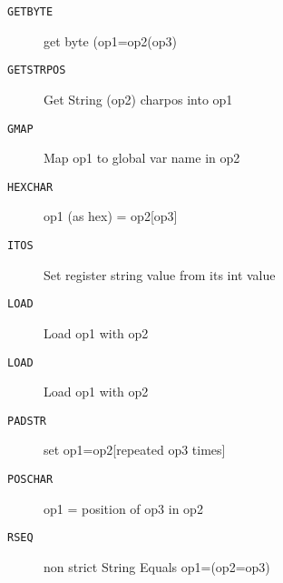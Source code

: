 
\begin{description}
\item[\texttt{GETBYTE    }]  get byte  (op1=op2(op3)\\
\end{description}

\begin{description}
\item[\texttt{GETSTRPOS  }]  Get String (op2) charpos into op1\\
\end{description}

\begin{description}
\item[\texttt{GMAP       }]  Map op1 to global var name in op2\\
\end{description}

\begin{description}
\item[\texttt{HEXCHAR    }]  op1 (as hex) = op2[op3]\\
\end{description}

\begin{description}
\item[\texttt{ITOS       }]  Set register string value from its int value\\
\end{description}

\begin{description}
\item[\texttt{LOAD       }]  Load op1 with op2\\
\end{description}

\begin{description}
\item[\texttt{LOAD       }]  Load op1 with op2\\
\end{description}

\begin{description}
\item[\texttt{PADSTR     }]  set op1=op2[repeated op3 times]\\
\end{description}

\begin{description}
\item[\texttt{POSCHAR    }]  op1 = position of op3 in op2\\
\end{description}

\begin{description}
\item[\texttt{RSEQ       }]  non strict String Equals op1=(op2=op3)\\
\end{description}
